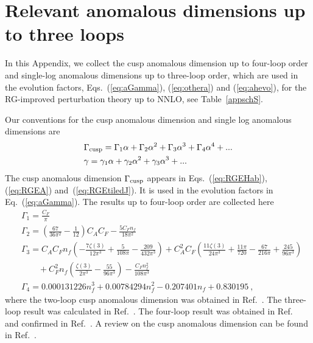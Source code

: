 \documentclass[a4paper,11pt]{article}
\begin{document}
\section{Relevant anomalous dimensions up to three loops}\label{sec:ano}
In this Appendix, we collect the cusp anomalous dimension up to four-loop order and single-log anomalous dimensions up to three-loop order, which are used in the evolution factors, Eqs.~(\ref{eq:aGamma}), (\ref{eq:othera}) and (\ref{eq:ahevo}), for the RG-improved perturbation theory up to NNLO, see Table~\ref{appschS}. 

Our conventions for the cusp anomalous dimension and single log anomalous dimensions are
\begin{align}
&\Gamma_{\rm cusp} = \Gamma_1 \alpha + \Gamma_2 \alpha^2 + \Gamma_3 \alpha^3 + \Gamma_4 \alpha^4 + ...\nonumber\\
&\gamma = \gamma_1 \alpha + \gamma_2 \alpha^2 + \gamma_3 \alpha^3 + ...
\end{align}
The cusp anomalous dimension $\Gamma_{\rm cusp}$ appears in Eqs.~(\ref{eq:RGEHab}), (\ref{eq:RGEA}) and~(\ref{eq:RGEtiledJ}). It is used in the evolution factors in Eq.~(\ref{eq:aGamma}). The results up to four-loop order are collected here
\begin{align}
&\Gamma_1 = \frac{C_F}{\pi} \nonumber\\
&\Gamma_2 = \left(\frac{67}{36 \pi ^2}-\frac{1}{12}\right) C_A C_F-\frac{5 C_F n_f}{18 \pi ^2} \nonumber\\
&\Gamma_3 = C_A C_F n_f\left( -\frac{7 \zeta (3)}{12 \pi ^3}+\frac{5}{108 \pi }-\frac{209}{432 \pi ^3} \right) + C_A^2 C_F \left(\frac{11 \zeta (3)}{24 \pi ^3}+\frac{11 \pi}{720}  -\frac{67}{216 \pi }+\frac{245}{96 \pi ^3}\right) \nonumber\\
& \quad \quad +  C_F^2 n_f\left(\frac{\zeta (3)}{2 \pi ^3}-\frac{55}{96 \pi ^3}\right)-\frac{C_F n_f^2}{108 \pi ^3} \nonumber\\
&\Gamma_4 = 0.000131226 n_f^3 + 0.00784294 n_f^2 - 0.207401 n_f + 0.830195 \ ,
\end{align}
where the two-loop cusp anomalous dimension was obtained in Ref.~\cite{Korchemskaya:1992je}. The three-loop result was calculated in Ref.~\cite{Moch:2004pa}. The four-loop result was obtained in Ref.~\cite{Henn:2019swt} and confirmed in Ref.~\cite{vonManteuffel:2020vjv}. A review on the cusp anomalous dimension can be found in Ref.~\cite{Grozin:2022umo}.
\end{document}
